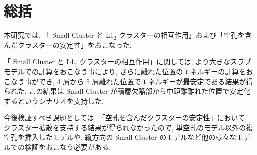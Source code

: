 \chapter{総括}
本研究では, 「 Small Cluster と L1$_2$ クラスターの相互作用」および「空孔を含んだクラスターの安定性」をおこなった.

「 Small Cluster と L1$_2$ クラスターの相互作用」に関しては, より大きなスラブモデルでの計算をおこなう事により, さらに離れた位置のエネルギーの計算をおこなう事ができ, 4 層から 5 層離れた位置でエネルギーが最安定である結果が得られた. この結果は Small Cluster が積層欠陥部から中距離離れた位置で安定化するというシナリオを支持した.

今後検証すべき課題としては, 「空孔を含んだクラスターの安定性」において, クラスター拡散を支持する結果が得られなかったので, 単空孔のモデル以外の複空孔を挿入したモデルや, 縦方向の Small Cluster のモデルなど他の様々なモデルでの検証をおこなう必要がある.